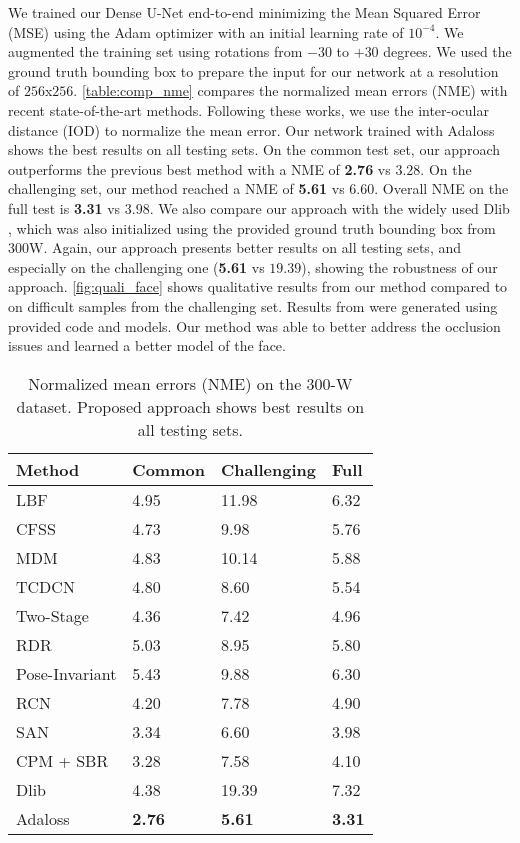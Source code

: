 \documentclass[10pt,twocolumn,letterpaper]{article}
\begin{document}
We trained our Dense U-Net end-to-end minimizing the Mean Squared Error
(MSE) using the Adam optimizer \cite{kingma2015} with an initial learning
rate of $10^{-4}$. We augmented the training set using rotations from
$-30$ to $+30$ degrees. We used the ground truth bounding box to prepare
the input for our network at a resolution of $256$x$256$. \autoref{table:comp_nme} compares the
normalized mean errors (NME) with recent state-of-the-art methods.
Following these works, we use the inter-ocular distance (IOD) to normalize
the mean error. Our network trained with Adaloss shows the best results
on all testing sets. On the common test set, our approach outperforms
the previous best method with a NME of \textbf{2.76} vs $3.28$.
On the challenging set, our method reached a NME of \textbf{5.61} vs
$6.60$. Overall NME on the full test is \textbf{3.31} vs $3.98$.
We also compare our approach with the widely used Dlib \cite{dlib},
which was also initialized using the provided ground truth bounding box
from 300W. Again, our approach presents better results on all testing
sets, and especially on the challenging one (\textbf{5.61} vs
$19.39$), showing the robustness of our approach.
\autoref{fig:quali_face} shows qualitative results from our
method compared to \cite{san} on difficult samples from the challenging
set. Results from \cite{san} were generated using provided code
and models. Our method was able to better address the occlusion
issues and learned a better model of the face.


\begin{table}[h]
  \centering
  \begin{tabular}{|l|l|l|l|}
    \hline
    Method & Common & Challenging & Full \\
    \hline
    LBF \cite{LBF} & 4.95 & 11.98 & 6.32 \\
    CFSS \cite{CFSS} & 4.73 & 9.98 & 5.76 \\
    MDM \cite{MDM} & 4.83 & 10.14 & 5.88 \\
    TCDCN \cite{TCDCN} & 4.80 & 8.60 & 5.54 \\
    Two-Stage \cite{twostage} & 4.36 & 7.42 & 4.96 \\
    RDR \cite{RDR} & 5.03 & 8.95 & 5.80 \\
    Pose-Invariant \cite{poseinvar} & 5.43 & 9.88 & 6.30 \\
    RCN \cite{honari2018} & 4.20 & 7.78 & 4.90 \\
    SAN \cite{san} & 3.34 & 6.60 & 3.98 \\
    CPM + SBR \cite{sbr} & 3.28 & 7.58 & 4.10 \\
    \hline
    Dlib \cite{dlib} & 4.38 & 19.39 & 7.32 \\
    \hline
    Adaloss & \textbf{2.76} & \textbf{5.61} & \textbf{3.31} \\
    \hline
  \end{tabular}
  \caption{Normalized mean errors (NME) on the 300-W dataset.
    Proposed approach shows best results on all testing sets.}
  \label{table:comp_nme}
\end{table}
\end{document}
